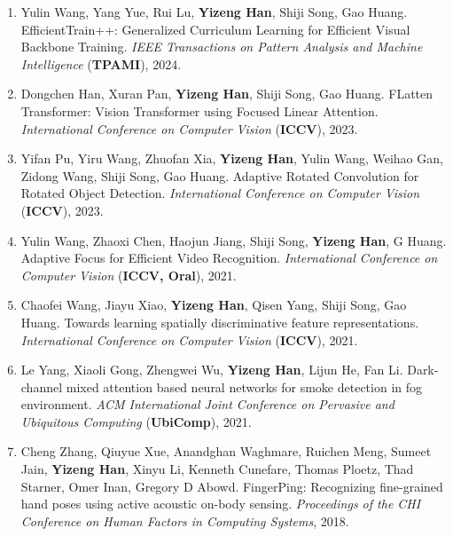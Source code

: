 \documentclass[10.5pt]{article}
\makeatletter
\newlength{\bibhang}
\newlength{\bibsep}
 {\@listi \global\bibsep\itemsep \global\advance\bibsep by\parsep}
\newenvironment{bibsection}%
        {\begin{enumerate}{%
       \setlength{\leftmargin}{-2em}%
       \setlength{\itemindent}{-2em}%
       \setlength{\itemsep}{\bibsep}%
        \setlength{\partopsep}{0pt}%
        \setlength{\topsep}{0pt}}}
        {\end{enumerate}\vspace{-.6\baselineskip}}
\makeatother
\begin{document}
\begin{sloppypar}
\begin{bibsection}
        \item Yulin Wang, Yang Yue, Rui Lu, \textbf{Yizeng Han}, Shiji Song,  Gao Huang. EfficientTrain++: Generalized Curriculum Learning for Efficient Visual Backbone Training. \emph{IEEE Transactions on Pattern Analysis and Machine Intelligence} (\textbf{TPAMI}), 2024.
        \item Dongchen Han, Xuran Pan, \textbf{Yizeng Han}, Shiji Song, Gao Huang. FLatten Transformer: Vision Transformer using Focused Linear Attention. \emph{International Conference on Computer Vision} (\textbf{ICCV}), 2023.
        \item Yifan Pu, Yiru Wang, Zhuofan Xia, \textbf{Yizeng Han}, Yulin Wang, Weihao Gan, Zidong Wang, Shiji Song, Gao Huang. Adaptive Rotated Convolution for Rotated Object Detection. \emph{International Conference on Computer Vision} (\textbf{ICCV}), 2023.
        \item Yulin Wang, Zhaoxi Chen, Haojun Jiang, Shiji Song, \textbf{Yizeng Han}, G Huang. Adaptive Focus for Efficient Video Recognition. \emph{International Conference on Computer Vision} (\textbf{ICCV, Oral}), 2021.
        \item Chaofei Wang, Jiayu Xiao, \textbf{Yizeng Han}, Qisen Yang, Shiji Song, Gao Huang. Towards learning spatially discriminative feature representations. \emph{International Conference on Computer Vision} (\textbf{ICCV}), 2021.
        \item Le Yang, Xiaoli Gong, Zhengwei Wu, \textbf{Yizeng Han}, Lijun He, Fan Li. Dark-channel mixed attention based neural networks for smoke detection in fog environment. \emph{ACM International Joint Conference on Pervasive and Ubiquitous Computing} (\textbf{UbiComp}), 2021.
        \item Cheng Zhang, Qiuyue Xue, Anandghan Waghmare, Ruichen Meng, Sumeet Jain, \textbf{Yizeng Han}, Xinyu Li, Kenneth Cunefare, Thomas Ploetz, Thad Starner, Omer Inan, Gregory D Abowd. FingerPing: Recognizing fine-grained hand poses using active acoustic on-body sensing. \emph{Proceedings of the CHI Conference on Human Factors in Computing Systems}, 2018.
\end{bibsection}


\end{sloppypar}
\end{document}
